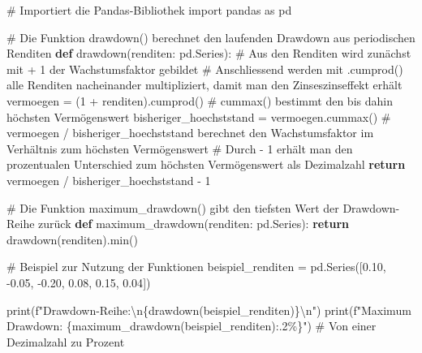 \documentclass[
  ngerman,
  a4paper,
  DIV=11,
  oneside]{scrreprt}
\newenvironment{Shaded}{\begin{snugshade}}{\end{snugshade}}
\newcommand{\BuiltInTok}[1]{\textcolor[rgb]{0.00,0.23,0.31}{#1}}
\newcommand{\CharTok}[1]{\textcolor[rgb]{0.13,0.47,0.30}{#1}}
\newcommand{\CommentTok}[1]{\textcolor[rgb]{0.37,0.37,0.37}{#1}}
\newcommand{\ControlFlowTok}[1]{\textcolor[rgb]{0.00,0.23,0.31}{\textbf{#1}}}
\newcommand{\DecValTok}[1]{\textcolor[rgb]{0.68,0.00,0.00}{#1}}
\newcommand{\FloatTok}[1]{\textcolor[rgb]{0.68,0.00,0.00}{#1}}
\newcommand{\ImportTok}[1]{\textcolor[rgb]{0.00,0.46,0.62}{#1}}
\newcommand{\KeywordTok}[1]{\textcolor[rgb]{0.00,0.23,0.31}{\textbf{#1}}}
\newcommand{\NormalTok}[1]{\textcolor[rgb]{0.00,0.23,0.31}{#1}}
\newcommand{\OperatorTok}[1]{\textcolor[rgb]{0.37,0.37,0.37}{#1}}
\newcommand{\SpecialCharTok}[1]{\textcolor[rgb]{0.37,0.37,0.37}{#1}}
\newcommand{\SpecialStringTok}[1]{\textcolor[rgb]{0.13,0.47,0.30}{#1}}
\begin{document}
\begin{Shaded}
\begin{Highlighting}[]
\CommentTok{\# Importiert die Pandas{-}Bibliothek}
\ImportTok{import}\NormalTok{ pandas }\ImportTok{as}\NormalTok{ pd}

\CommentTok{\# Die Funktion drawdown() berechnet den laufenden Drawdown aus periodischen Renditen}
\KeywordTok{def}\NormalTok{ drawdown(renditen: pd.Series):}
    \CommentTok{\# Aus den Renditen wird zunächst mit + 1 der Wachstumsfaktor gebildet}
    \CommentTok{\# Anschliessend werden mit .cumprod() alle Renditen nacheinander multipliziert, damit man den Zinseszinseffekt erhält}
\NormalTok{    vermoegen }\OperatorTok{=}\NormalTok{ (}\DecValTok{1} \OperatorTok{+}\NormalTok{ renditen).cumprod()}
    \CommentTok{\# cummax() bestimmt den bis dahin höchsten Vermögenswert}
\NormalTok{    bisheriger\_hoechststand }\OperatorTok{=}\NormalTok{ vermoegen.cummax()}
    \CommentTok{\# vermoegen / bisheriger\_hoechststand berechnet den Wachstumsfaktor im Verhältnis zum höchsten Vermögenswert}
    \CommentTok{\# Durch {-} 1 erhält man den prozentualen Unterschied zum höchsten Vermögenswert als Dezimalzahl}
    \ControlFlowTok{return}\NormalTok{ vermoegen }\OperatorTok{/}\NormalTok{ bisheriger\_hoechststand }\OperatorTok{{-}} \DecValTok{1}

\CommentTok{\# Die Funktion maximum\_drawdown() gibt den tiefsten Wert der Drawdown{-}Reihe zurück}
\KeywordTok{def}\NormalTok{ maximum\_drawdown(renditen: pd.Series):}
    \ControlFlowTok{return}\NormalTok{ drawdown(renditen).}\BuiltInTok{min}\NormalTok{()}

\CommentTok{\# Beispiel zur Nutzung der Funktionen}
\NormalTok{beispiel\_renditen }\OperatorTok{=}\NormalTok{ pd.Series([}\FloatTok{0.10}\NormalTok{, }\OperatorTok{{-}}\FloatTok{0.05}\NormalTok{, }\OperatorTok{{-}}\FloatTok{0.20}\NormalTok{, }\FloatTok{0.08}\NormalTok{, }\FloatTok{0.15}\NormalTok{, }\FloatTok{0.04}\NormalTok{])}

\BuiltInTok{print}\NormalTok{(}\SpecialStringTok{f"Drawdown{-}Reihe:}\CharTok{\textbackslash{}n}\SpecialCharTok{\{}\NormalTok{drawdown(beispiel\_renditen)}\SpecialCharTok{\}}\CharTok{\textbackslash{}n}\SpecialStringTok{"}\NormalTok{)}
\BuiltInTok{print}\NormalTok{(}\SpecialStringTok{f"Maximum Drawdown: }\SpecialCharTok{\{}\NormalTok{maximum\_drawdown(beispiel\_renditen)}\SpecialCharTok{:.2\%\}}\SpecialStringTok{"}\NormalTok{) }\CommentTok{\# Von einer Dezimalzahl zu Prozent}
\end{Highlighting}
\end{Shaded}
\end{document}
